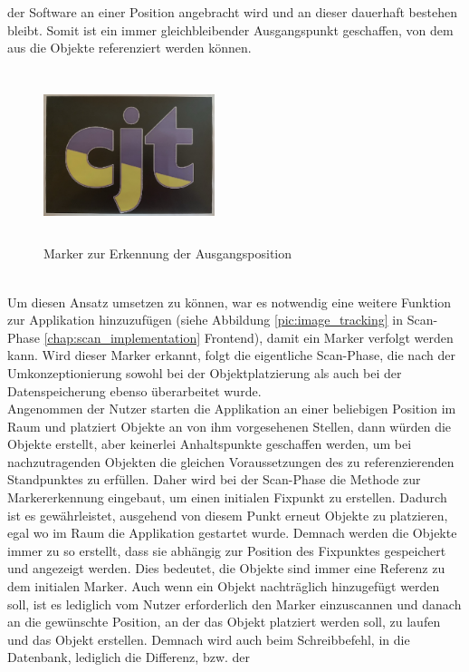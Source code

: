 der Software an einer Position angebracht wird und an dieser dauerhaft bestehen bleibt. Somit ist ein immer gleichbleibender Ausgangspunkt geschaffen, von dem aus 
die Objekte referenziert werden können.
\begin{figure}[hbt!]
    \centering
    \includegraphics[width=5cm,height=5cm,keepaspectratio]{4Umsetzung/Bilder/cjt_logo_tracking.png}
    \caption{Marker zur Erkennung der Ausgangsposition}
    \label{pic:initialMarker}
\end{figure}
\\
Um diesen Ansatz umsetzen zu können, war es notwendig eine weitere Funktion zur Applikation hinzuzufügen (siehe Abbildung \ref{pic:image_tracking} 
in Scan-Phase \ref{chap:scan_implementation} Frontend), damit ein Marker verfolgt werden kann. Wird dieser Marker erkannt, folgt die eigentliche Scan-Phase, 
die nach der Umkonzeptionierung sowohl bei der Objektplatzierung als auch bei der Datenspeicherung ebenso überarbeitet wurde. 
\\ 
\linebreak
Angenommen der Nutzer starten die Applikation an einer beliebigen Position im Raum und platziert Objekte an von ihm vorgesehenen Stellen, dann würden die 
Objekte erstellt, aber keinerlei Anhaltspunkte geschaffen werden, um bei nachzutragenden Objekten die gleichen Voraussetzungen des zu referenzierenden Standpunktes 
zu erfüllen. Daher wird bei der Scan-Phase die Methode zur Markererkennung eingebaut, um einen initialen Fixpunkt zu erstellen. Dadurch ist es gewährleistet, 
ausgehend von diesem Punkt erneut Objekte zu platzieren, egal wo im Raum die Applikation gestartet wurde. Demnach werden die Objekte immer zu so erstellt, dass sie 
abhängig zur Position des Fixpunktes gespeichert und angezeigt werden. Dies bedeutet, die Objekte sind immer eine Referenz zu dem initialen Marker. Auch wenn 
ein Objekt nachträglich hinzugefügt werden soll, ist es lediglich vom Nutzer erforderlich den Marker einzuscannen und danach an die gewünschte Position, an der 
das Objekt platziert werden soll, zu laufen und das Objekt erstellen. Demnach wird auch beim Schreibbefehl, in die Datenbank, lediglich die Differenz, bzw. der 

